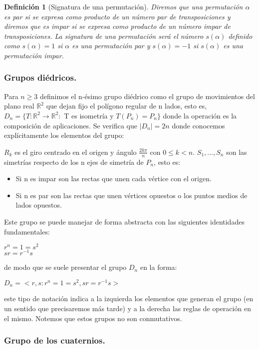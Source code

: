 \documentclass{article}
\theoremstyle{theorem-style}  %
\theoremstyle{definition-style}
\newtheorem{definition}{Definición}[section]
\theoremstyle{example-style}
\begin{document}
\begin{definition}[Signatura de una permutación]
Diremos que una permutación $\alpha$ es par si se expresa como producto de un número par de transposiciones y diremos que es impar si se expresa como producto de un número impar de transposiciones. La signatura de una permutación será el número $s(\alpha)$ definido como $s(\alpha) = 1$ si $\alpha$ es una permutación par y $s(\alpha) = -1$ si $s(\alpha)$ es una permutación impar.
\end{definition}

\subsubsection{Grupos diédricos.}

Para $n \ge 3$ definimos el n-ésimo grupo diédrico como el grupo de movimientos del plano real $\mathbb{R}^2$ que dejan fijo el polígono regular de n lados, esto es, $D_n = \{T:\mathbb{R}^2 \rightarrow \mathbb{R}^2 :$ T es isometría  y  $T(P_n) = P_n\}$ donde la operación es la composición de aplicaciones. Se verifica que $|D_n| = 2n$ donde conocemos explícitamente los elementos del grupo:

$R_k$ es el giro centrado en el origen y ángulo $\frac{2k\pi}{n}$ con $0 \le k < n$.
$S_1,...,S_n$ son las simetrías respecto de los n ejes de simetría de $P_n$, esto es:
\begin{itemize}
\item Si n es impar son las rectas que unen cada vértice con el origen.
\item Si n es par son las rectas que unen vértices opuestos o los puntos medios de lados opuestos.
\end{itemize}
  
Este grupo se puede manejar de forma abstracta con las siguientes identidades fundamentales:

$r^n = 1 = s^2$\\
$sr = r^{-1}s$

de modo que se suele presentar el grupo $D_n$ en la forma:

$D_n = <r,s : r^n = 1 = s^2,sr = r^{-1}s>$

este tipo de notación indica a la izquierda los elementos que generan el grupo (en un sentido que precisaremos más tarde) y a la derecha las reglas de operación en el mismo. Notemos que estos grupos no son conmutativos.

\subsubsection{Grupo de los cuaternios.}
\end{document}
